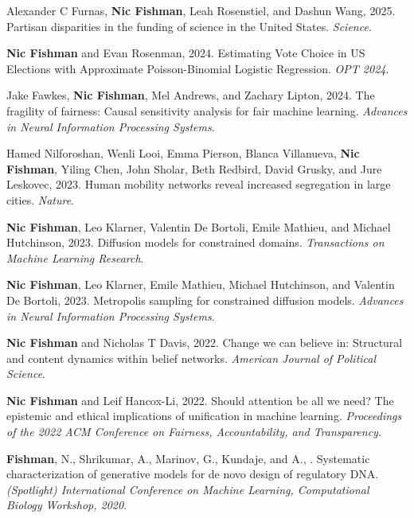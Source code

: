 \begin{cvparagraph}


\begin{addmargin}[2em]{0em}

Alexander C Furnas, \textbf{Nic Fishman}, Leah Rosenstiel, and Dashun Wang, 2025. Partisan disparities in the funding of science in the United States. \textit{Science}.

\textbf{Nic Fishman} and Evan Rosenman, 2024. Estimating Vote Choice in US Elections with Approximate Poisson-Binomial Logistic Regression. \textit{OPT 2024}.

Jake Fawkes, \textbf{Nic Fishman}, Mel Andrews, and Zachary Lipton, 2024. The fragility of fairness: Causal sensitivity analysis for fair machine learning. \textit{Advances in Neural Information Processing Systems}.

Hamed Nilforoshan, Wenli Looi, Emma Pierson, Blanca Villanueva, \textbf{Nic Fishman}, Yiling Chen, John Sholar, Beth Redbird, David Grusky, and Jure Leskovec, 2023. Human mobility networks reveal increased segregation in large cities. \textit{Nature}.

\textbf{Nic Fishman}, Leo Klarner, Valentin De Bortoli, Emile Mathieu, and Michael Hutchinson, 2023. Diffusion models for constrained domains. \textit{Transactions on Machine Learning Research}.

\textbf{Nic Fishman}, Leo Klarner, Emile Mathieu, Michael Hutchinson, and Valentin De Bortoli, 2023. Metropolis sampling for constrained diffusion models. \textit{Advances in Neural Information Processing Systems}.

\textbf{Nic Fishman} and Nicholas T Davis, 2022. Change we can believe in: Structural and content dynamics within belief networks. \textit{American Journal of Political Science}.

\textbf{Nic Fishman} and Leif Hancox-Li, 2022. Should attention be all we need? The epistemic and ethical implications of unification in machine learning. \textit{Proceedings of the 2022 ACM Conference on Fairness, Accountability, and Transparency}.

\textbf{Fishman}, N., Shrikumar, A., Marinov, G., Kundaje, and A., . Systematic characterization of generative models for de novo design of regulatory DNA. \textit{(Spotlight) International Conference on Machine Learning, Computational Biology Workshop, 2020}.


\end{addmargin}
\end{cvparagraph}
